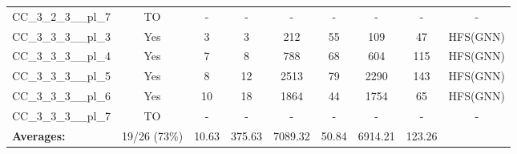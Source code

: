 \documentclass{article}
\begin{document}
\begin{tabular}{lcccccccc}
CC\_3\_2\_3\_\_pl\_7 & TO & - & - & - & - & - & - & - \\
CC\_3\_3\_3\_\_pl\_3 & Yes & 3 & 3 & 212 & 55 & 109 & 47 & HFS(GNN) \\
CC\_3\_3\_3\_\_pl\_4 & Yes & 7 & 8 & 788 & 68 & 604 & 115 & HFS(GNN) \\
CC\_3\_3\_3\_\_pl\_5 & Yes & 8 & 12 & 2513 & 79 & 2290 & 143 & HFS(GNN) \\
CC\_3\_3\_3\_\_pl\_6 & Yes & 10 & 18 & 1864 & 44 & 1754 & 65 & HFS(GNN) \\
CC\_3\_3\_3\_\_pl\_7 & TO & - & - & - & - & - & - & - \\
\textbf{Averages:} & 19/26 (73\%) & 10.63 & 375.63 & 7089.32 & 50.84 & 6914.21 & 123.26 & \\
\bottomrule
\end{tabular}
\\[0.7cm]
\end{document}

